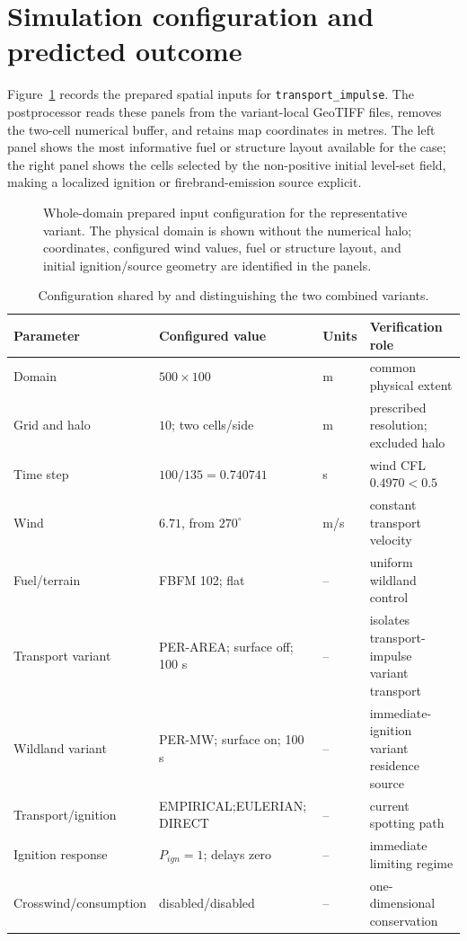 \section{Simulation configuration and predicted outcome}

Figure~\ref{fig:input-configuration} records the prepared spatial inputs for \texttt{transport\_impulse}.
The postprocessor reads these panels from the variant-local GeoTIFF files, removes the
two-cell numerical buffer, and retains map coordinates in metres.  The left panel shows
the most informative fuel or structure layout available for the case; the right panel
shows the cells selected by the non-positive initial level-set field, making a localized
ignition or firebrand-emission source explicit.

\begin{figure}[H]
\centering
{}
\caption{Whole-domain prepared input configuration for the representative variant.  The
physical domain is shown without the numerical halo; coordinates, configured wind values,
fuel or structure layout, and initial ignition/source geometry are identified in the panels.}
\label{fig:input-configuration}
\end{figure}

\begin{table}[!htbp]\centering\small
\begin{tabular}{p{}p{}p{}p{}}
\toprule Parameter & Configured value & Units & Verification role\\ \midrule
Domain & $500\times100$ & m & common physical extent\\
Grid and halo & $10$; two cells/side & m & prescribed resolution; excluded halo\\
Time step & $100/135=0.740741$ & s & wind CFL $0.4970<0.5$\\
Wind & $6.71$, from $270^\circ$ & m/s & constant transport velocity\\
Fuel/terrain & FBFM 102; flat & -- & uniform wildland control\\
Transport variant & PER-AREA; surface off; 100 s & -- & isolates transport-impulse variant transport\\
Wildland variant & PER-MW; surface on; 100 s & -- & immediate-ignition variant residence source\\
Transport/ignition & EMPIRICAL;\newline EULERIAN; DIRECT & -- & current spotting path\\
Ignition response & $P_{ign}=1$; delays zero & -- & immediate limiting regime\\
Crosswind/consumption & disabled/disabled & -- & one-dimensional conservation\\
\bottomrule
\end{tabular}
\caption{Configuration shared by and distinguishing the two combined variants.}
\end{table}
\FloatBarrier

